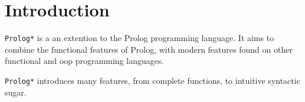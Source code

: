 \section{Introduction}

\texttt{Prolog*} is a an extention to the Prolog programming language. It
aims to combine the functional features of Prolog, with modern features found
on other functional and oop programming languages.

\texttt{Prolog*} introduces many features, from complete functions, to
intuitive syntactic sugar.

